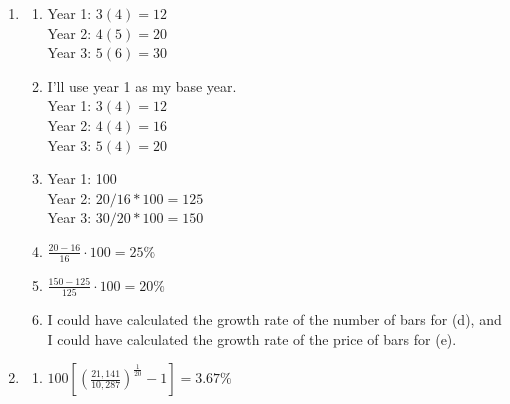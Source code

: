 \documentclass{article}
\begin{document}
\begin{enumerate}
\begin{enumerate}
		In 2024, the quantities changed, but the prices didn't, so nominal GDP and real GDP increased while the GDP deflator remained constant. In 2025, the prices changed, but the quantities didn't, so nominal GDP and the GDP deflator increased while real GDP remained constant. 
		
	\item Economic well-being increased more in 2024 because in 2024 production increased. As a result, the country can produce more for itself.
		
	\end{enumerate}
	
\item 

	\begin{enumerate}
	
	\item Year 1: $3(4) = 12$ \\
		Year 2: $4(5) = 20$ \\
		Year 3: $5(6) = 30$
	
	\item I'll use year 1 as my base year. \\
		Year 1: $3(4) = 12$ \\
		Year 2: $4(4) = 16$ \\
		Year 3: $5(4) = 20$ \\
		
	\item Year 1: 100 \\
		Year 2: $20 / 16 * 100 = 125$ \\
		Year 3: $30 / 20 * 100 = 150$
		
	\item $\frac{20 - 16}{16} \cdot 100 = 25 \%$
	
	\item $\frac{150 - 125}{125} \cdot 100 = 20\%$
	
	\item I could have calculated the growth rate of the number of bars for (d), and I could have calculated the growth rate of the price of bars for (e). 
	
	\end{enumerate}
	
\item

	\begin{enumerate}
	
	\item $100 \left[ \left( \frac{21,141}{10,287} \right)^{\frac{1}{20}} -1 \right] = 3.67 \%$
	

\end{enumerate}
\end{enumerate}
\end{document}
